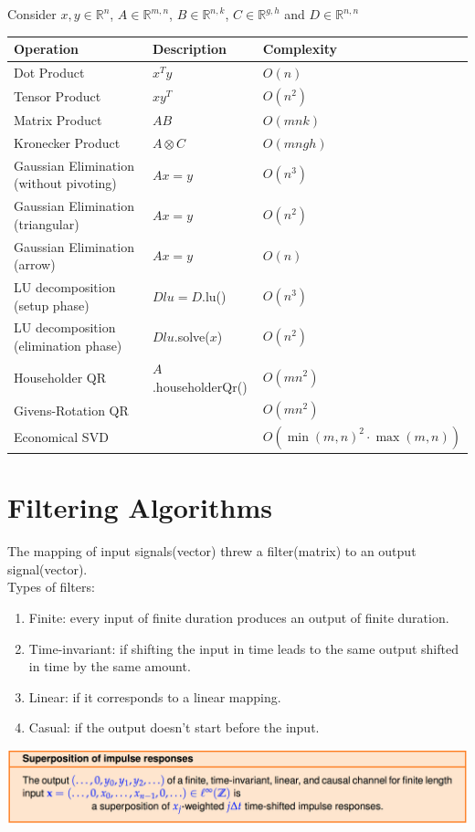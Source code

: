 \documentclass[12pt, a4paper]{article}
\begin{document}
Consider $x, y \in \mathbb{R}^n$, $A \in \mathbb{R}^{m,n}$, $B \in \mathbb{R}^{n,k}$, $C \in \mathbb{R}^{g,h}$ and $D \in \mathbb{R}^{n,n}$

\begin{table}[H]
\centering
\begin{tabular}{|l|l|l|}
\hline
\textbf{Operation} & \textbf{Description} & \textbf{Complexity} \\ \hline
Dot Product 	   & $x^Ty$ 				  & $O(n)$              \\ \hline
Tensor Product	   & $xy^T$               & $O(n^2)$			    \\ \hline
Matrix Product	   & $AB$             	  & $O(mnk)$			    \\ \hline
Kronecker Product  & $A \otimes C$        & $O(mngh)$			\\ \hline
Gaussian Elimination (without pivoting) & $Ax = y$        & $O(n^3)$			\\ \hline
Gaussian Elimination (triangular) & $Ax = y$        & $O(n^2)$			\\ \hline
Gaussian Elimination (arrow) & $Ax = y$        & $O(n)$			\\ \hline
LU decomposition (setup phase) & $Dlu = D$.lu()  & $O(n^3)$			\\ \hline
LU decomposition (elimination phase) & $Dlu$.solve($x$)  & $O(n^2)$			\\ \hline
Householder QR & $A$.householderQr()  & $O(mn^2)$			\\ \hline
Givens-Rotation QR &   & $O(mn^2)$			\\ \hline
Economical SVD & & $O(\min(m, n)^2\cdot\max(m,n))$ \\ \hline
\end{tabular}
\end{table}


\section{Filtering Algorithms}
The mapping of input signals(vector) threw a filter(matrix) to an output signal(vector).
\\Types of filters:
\begin{enumerate}
	\item Finite: every input of finite duration produces an output of finite duration.
	\item Time-invariant: if shifting the input in time leads to the same output shifted in time by the same amount.
	\item Linear: if it corresponds to a linear mapping.
	\item Casual: if the output doesn't start before the input.
\end{enumerate}
\begin{center}
	\includegraphics[width=380pt]{superposOfImpulseResp.png}
\end{center}
\end{document}

